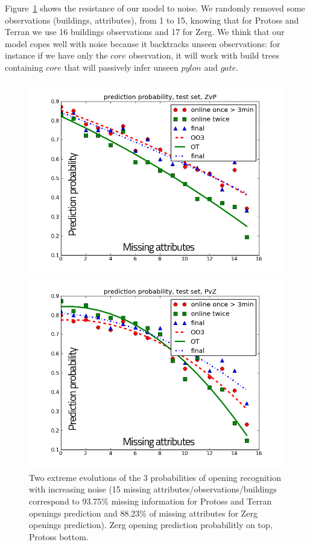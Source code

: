 Figure~\ref{fig:openingsnoise} shows the resistance of our model to noise. We randomly removed some observations (buildings, attributes), from 1 to 15, knowing that for Protoss and Terran we use 16 buildings observations and 17 for Zerg. We think that our model copes well with noise because it backtracks unseen observations: for instance if we have only the $core$ observation, it will work with build trees containing $core$ that will passively infer unseen $pylon$ and $gate$. 


\begin{figure}[h]
\centerline{\includegraphics[width=0.7\columnwidth]{images/ZvP2.png}}
\centerline{\includegraphics[width=0.7\columnwidth]{images/PvZ2.png}}
\caption{Two extreme evolutions of the 3 probabilities of opening recognition with increasing noise (15 missing attributes/observations/buildings correspond to 93.75\% missing information for Protoss and Terran openings prediction and 88.23\% of missing attributes for Zerg openings prediction). Zerg opening prediction probabilitly on top, Protoss bottom.}
\label{fig:openingsnoise}
\end{figure}

